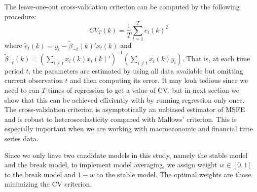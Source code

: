 The leave-one-out cross-validation criterion can be computed by the following procedure:
\begin{equation}
	CV_T(k) = \frac{1}{T}\sum_{t=1}^{T}\tilde{e}_{t}(k)^{2}
\end{equation}
where $\tilde{e}_{t}(k) = y_t - \tilde{\beta}_{-t}(k)'x_t(k)$ and $\tilde{\beta}_{-t}(k) = (\sum_{i\not= t}x_i(k) x_i(k)')^{-1}(\sum_{i\not= t}x_i(k) y_i)$. That is, at each time period $t$, the parameters are estimated by using all data available but omitting current observation $t$ and then computing its error. It may look tedious since we need to run $T$ times of regression to get a value of CV, but in next section we show that this can be achieved efficiently with by running regression only once. The cross-validation criterion is asymptotically an unbiased estimator of MSFE and is robust to heteroscedasticity compared with Mallows' criterion. This is especially important when we are working with macroeconomic and financial time series data.

Since we only have two candidate models in this study, namely the stable model and the break model, to implement model averaging, we assign weight $w \in [0,1]$ to the break model and $1 - w$ to the stable model. The optimal weights are those minimizing the CV criterion.
